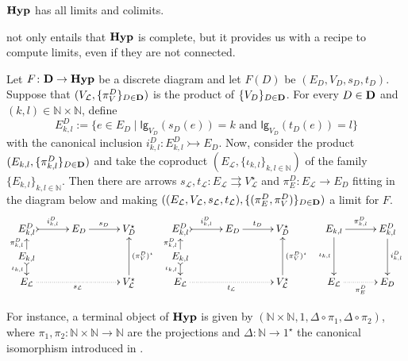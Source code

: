 \documentclass[3p]{elsarticle}
\newcommand{\lgh}{\mathsf{lg}}
\def\D{\textbf {\textup{D}}}
\newcommand{\catname}[1]{\textbf{\textup{#1}}}
\newcommand{\hyp}{\catname{Hyp}}
\newcommand{\mto}{\rightarrowtail}
\theoremstyle{remark}
\theoremstyle{definition}
\begin{document}
\begin{cor}\label{prop:cocomp}
	$\hyp$ has all limits and colimits.
\end{cor}


 not only entails that $\hyp$ is complete, but it provides us with a recipe to compute limits, even if they are not connected.
	\begin{cor}\label{lem:prod}
		Let $F\colon \D\to \hyp $ be a  discrete diagram and let $F(D)$ be $(E_D, V_D, s_D,  t_D)$. Suppose that $(V_{\mathcal{L}}, \{\pi^D_V\}_{D\in \D})$ is the product of $\{V_D\}_{D\in \D}$. For every $D\in \D$ and $(k,l)\in \mathbb{N}\times \mathbb{N}$, define
		\[E^D_{k,l}:=\{e\in E_D \mid \lgh_{V_D}(s_{D}(e)) = k \text{ and } \lgh_{V_D}(t_{D}(e)) = l \}\]
		with the canonical inclusion $i^D_{k,l}\colon E^D_{k,l}\mto E_D$.	Now, consider the product $(E_{k,l}, \{\pi^D_{k,l}\}_{D\in \D})$ and take the coproduct $(E_{\mathcal{L}}, \{\iota_{k,l}\}_{k,l \in \mathbb{N}})$ of the family $\{E_{k,l}\}_{k,l \in \mathbb{N}}$. Then there are arrows $s_{\mathcal{L}}, t_{\mathcal{L}}\colon E_{\mathcal{L}}\rightrightarrows V_{\mathcal{L}}^\star$ and $\pi^D_E\colon E_{\mathcal{L}}\to E_D$ fitting in the diagram below and making $((E_{\mathcal{L}}, V_{\mathcal{L}}, s_{\mathcal{L}}, t_{\mathcal{L}}), \{(\pi^D_E, \pi^D_V)\}_{D\in \D})$ a limit for $F$.
		\[\xymatrix@R=10pt@C=30pt{E^D_{k,l} \ar@{>->}[r]^{i^D_{k,l}} & E_D \ar[r]^{s_D} & V^\star_D  &E^D_{k,l} \ar@{>->}[r]^{i^D_{k,l}} & E_D \ar[r]^{t_D} & V^\star_D & E_{k,l} \ar[r]^{\pi^D_{k,l}} \ar[dd]_{\iota_{k,l}} & E^{D}_{k,l} \ar[dd]^{i^D_{k,l}}\\  E_{k,l} \ar@{>->}[d]_{\iota_{k,l}} \ar[u]^{\pi^D_{k,l}}  & & &E_{k,l} \ar@{>->}[d]_{\iota_{k,l}} \ar[u]^{\pi^D_{k,l}}  & & \\  E_{\mathcal{L}}   \ar@{.>}[rr]_{s_\mathcal{L}}& &V_{\mathcal{L}}^\star \ar[uu]_{(\pi^D_V)^\star} &  E_{\mathcal{L}}   \ar@{.>}[rr]_{t_\mathcal{L}}& &V_{\mathcal{L}}^\star \ar[uu]_{(\pi^D_V)^\star} & E_{\mathcal{L}} \ar@{.>}[r]_{\pi^D_E} & E_D}
		\]
	\end{cor}

\begin{exa}\label{ex:term} For instance, a terminal object of $\hyp$ is given by $(\mathbb{N}\times \mathbb{N}, 1, \Delta\circ \pi_1, \Delta\circ \pi_2)$, where $\pi_1, \pi_2\colon \mathbb{N}\times \mathbb{N}\to \mathbb{N}$ are the projections and $\Delta\colon \mathbb{N}\to 1^\star$ the canonical isomorphism introduced in . 
\end{exa}
 
\end{document}
